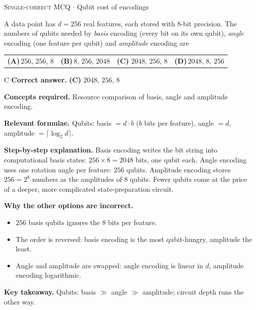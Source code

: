 \documentclass[11pt,a4paper]{article}
\newcommand{\optlabel}[1]{\textbf{(#1)}}
\newcommand{\correctlabel}[1]{\textcolor{okgreen}{\textbf{(#1)}\,\ding{51}}}
\newenvironment{qitem}[1]{\begin{list}{}{\setlength{\leftmargin}{3.3em}\setlength{\labelwidth}{3.1em}%
  \setlength{\labelsep}{0.2em}\setlength{\topsep}{3pt}\setlength{\parsep}{3pt}}\item[\textbf{Q.#1}\hfill]}{\end{list}}
\newcommand{\qsep}{\par\vspace{2pt}{\color{black!15}\hrule}\vspace{4pt}}
\newcommand{\qmeta}[2]{{\footnotesize\color{black!60}\textsc{#1} \;$\cdot$\; #2}\par}
\begin{document}
\begin{qitem}{43}
\qmeta{Single-correct MCQ}{Qubit cost of encodings}
A data point has $d = 256$ real features, each stored with 8-bit precision. The numbers of qubits needed by
\emph{basis} encoding (every bit on its own qubit), \emph{angle} encoding (one feature per qubit) and \emph{amplitude} encoding are
\par\smallskip\noindent\begin{tabularx}{\linewidth}{@{}*{4}{L}@{}}
\optlabel{A}\,$256$, $256$, $8$ & \optlabel{B}\,$8$, $256$, $2048$ & \correctlabel{C}\,$2048$, $256$, $8$ & \optlabel{D}\,$2048$, $8$, $256$
\end{tabularx}
\end{qitem}
\begin{solbox}{C}
\textbf{\color{brand}Correct answer.} \textcolor{okgreen}{\textbf{(C)}} $2048$, $256$, $8$

\textbf{\color{brand}Concepts required.} Resource comparison of basis, angle and amplitude encoding.

\textbf{\color{brand}Relevant formulae.} Qubits: basis $= d\cdot b$ ($b$ bits per feature), angle $= d$, amplitude $= \lceil\log_2d\rceil$.

\textbf{\color{brand}Step-by-step explanation.} Basis encoding writes the bit string into computational basis states: $256 \times 8 = 2048$ bits, one qubit each.
Angle encoding uses one rotation angle per feature: $256$ qubits. Amplitude encoding stores $256 = 2^8$ numbers as the
amplitudes of $8$ qubits. Fewer qubits come at the price of a deeper, more complicated state-preparation circuit.

\textbf{\color{brand}Why the other options are incorrect.}
\begin{itemize}[leftmargin=2.4em, itemsep=1pt, topsep=2pt]
\item[\textbf{(A)}] $256$ basis qubits ignores the 8 bits per feature.
\item[\textbf{(B)}] The order is reversed: basis encoding is the most qubit-hungry, amplitude the least.
\item[\textbf{(D)}] Angle and amplitude are swapped: angle encoding is linear in $d$, amplitude encoding logarithmic.
\end{itemize}
\textbf{\color{brand}Key takeaway.} Qubits: basis $\gg$ angle $\gg$ amplitude; circuit depth runs the other way.
\end{solbox}
\qsep
\end{document}

